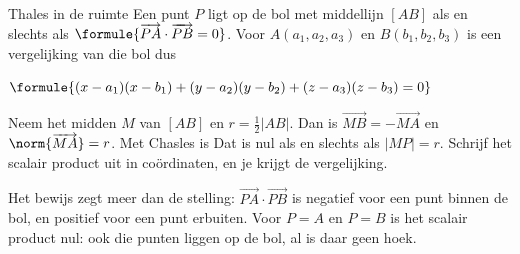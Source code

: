 \begin{theorie}
\begin{stelling}{Thales in de ruimte}
Een punt $P$ ligt op de bol met middellijn $[AB]$ als en slechts als $\formule{\overrightarrow{PA} \cdot \overrightarrow{PB} = 0}$. Voor $A(a_1, a_2, a_3)$ en $B(b_1, b_2, b_3)$ is een vergelijking van die bol dus

\vspace{1mm}
\qquad $\formule{(x - a_1)(x - b_1) + (y - a_2)(y - b_2) + (z - a_3)(z - b_3) = 0}$
\end{stelling}

\begin{minipage}[t]{.66\linewidth}
\vspace{0pt}
\begin{bewijs}
Neem het midden $M$ van $[AB]$ en $r = \tfrac12|AB|$. Dan is $\overrightarrow{MB} = -\overrightarrow{MA}$ en $\norm{\overrightarrow{MA}} = r$. Met Chasles is
Dat is nul als en slechts als $|MP| = r$. Schrijf het scalair product uit in coördinaten, en je krijgt de vergelijking.
\end{bewijs}
\end{minipage}\hfill
\begin{minipage}[t]{.3\linewidth}
\vspace{0pt}
\centering
{}
\end{minipage}
\end{theorie}

Het bewijs zegt meer dan de stelling: $\overrightarrow{PA} \cdot \overrightarrow{PB}$ is negatief voor een punt binnen de bol, en positief voor een punt erbuiten. Voor $P = A$ en $P = B$ is het scalair product nul: ook die punten liggen op de bol, al is daar geen hoek.

